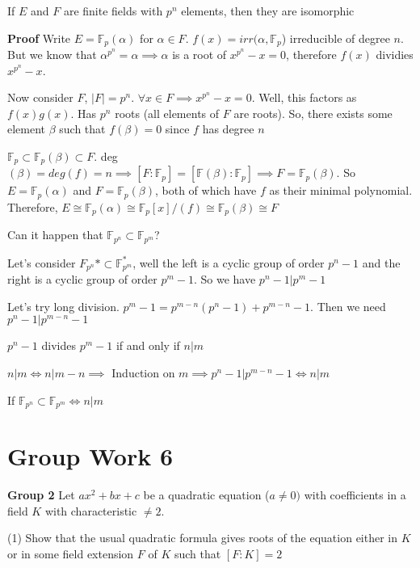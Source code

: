 \documentclass[twoside, 10pt]{article}
\newcommand{\F}{\mathbb{F}}
\begin{document}
\begin{thm}
    If $E$ and $F$ are finite fields with $p^n$ elements, then they are isomorphic
\end{thm}
\textbf{Proof} Write $E = \F_p(\alpha)$ for $\alpha \in F$. $f(x) = irr(\alpha, \F_p$) irreducible of degree $n$. But we know that $\alpha^{p^n} = \alpha \implies \alpha$ is a root of $x^{p^n} - x =  0$, therefore $f(x)$ dividies $x^{p^n} - x$. 

Now consider $F$, $|F| = p^n$. $\forall x \in F \implies x^{p^n} - x = 0$. Well, this factors as $f(x)g(x)$. Has $p^n$ roots (all elements of $F$ are roots). So, there exists some element $\beta$ such that $f(\beta) = 0$ since $f$ has degree $n$

$\F_p \subset \F_p(\beta) \subset F$. deg$(\beta) = deg(f) = n \implies [F: \F_p] = [\F(\beta) : \F_p] \implies F = \F_p(\beta)$. So $E = \F_p(\alpha)$ and $F = \F_p(\beta)$, both of which have $f$ as their minimal polynomial. Therefore, $E \cong \F_p(\alpha) \cong \F_p[x]/(f) \cong \F_p(\beta) \cong F$

\begin{rmk}
    Can it happen that $\F_{p^n} \subset \F_{p^m}$?
\end{rmk}
Let's consider $F_{p^n}* \subset \F_{p^m}^*$, well the left is a cyclic group of order $p^n - 1$ and the right is a cyclic group of order $p^m - 1$. So we have $p^n - 1|p^m - 1$

Let's try long division. $p^m - 1 = p^{m-n}(p^n - 1) + p^{m-n} - 1$. Then we need $p^n - 1 | p^{m-n} - 1$

\begin{thm}
    $p^n - 1$ divides $p^m - 1$ if and only if $n | m$
\end{thm}
$n | m \iff n | m - n \implies$ Induction on $m \implies p^n - 1 | p^{m-n} - 1 \iff n | m$
\begin{cor}
    If $\F_{p^n} \subset \F_{p^m} \iff n | m$
\end{cor}

\section{Group Work 6}
\textbf{Group 2}
Let $ax^2 + bx + c$ be a quadratic equation ($a \neq 0)$ with coefficients in a field $K$ with characteristic $\neq 2$. 

(1) Show that the usual quadratic formula gives roots of the equation either in $K$ or in some field extension $F$ of $K$ such that $[F : K] = 2$
\end{document}
